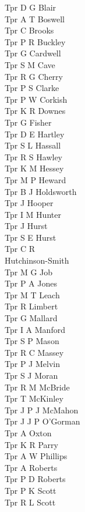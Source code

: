 \begin{multicols}{4}
  Tpr D G Blair \\
  Tpr A T Boswell \\
  Tpr C Brooks \\
  Tpr P R Buckley \\
  Tpr G Cardwell \\
  Tpr S M Cave \\
  Tpr R G Cherry \\
  Tpr P S Clarke \\
  Tpr P W Corkish \\
  Tpr K R Downes \\
  Tpr G Fisher \\
  Tpr D E Hartley \\
  Tpr S L Hassall \\
  Tpr R S Hawley \\
  Tpr K M Hessey \\
  Tpr M P Heward \\
  Tpr B J Holdsworth \\
  Tpr J Hooper \\
  Tpr I M Hunter \\
  Tpr J Hurst \\
  Tpr S E Hurst \\
  Tpr C R \\ \indent Hutchinson-Smith \\
  Tpr M G Job \\
  Tpr P A Jones \\
  Tpr M T Leach \\
  Tpr R Limbert \\
  Tpr G Mallard \\
  Tpr I A Manford \\
  Tpr S P Mason \\
  Tpr R C Massey \\
  Tpr P J Melvin \\
  Tpr S J Moran \\
  Tpr R M McBride \\
  Tpr T McKinley \\
  Tpr J P J McMahon \\
  Tpr J J P O'Gorman \\
  Tpr A Oxton \\
  Tpr K R Parry \\
  Tpr A W Phillips \\
  Tpr A Roberts \\
  Tpr P D Roberts \\
  Tpr P K Scott \\
  Tpr R L Scott \\

\end{multicols}

